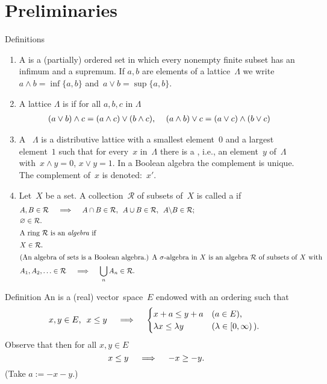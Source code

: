 \documentclass[main.tex]{subfiles}
\begin{document}
\section{Preliminaries}
%
%
\begin{psec}{Definitions}
\label{1.1}
\begin{enumerate}
\item
\label{1.1-1} 
A  is a (partially) ordered set in which
every nonempty finite subset has an infimum and a supremum. 
If $a,b$ are elements of a lattice~$\Lambda$ 
we write~$a\wedge b = \inf\{a,b\}$
and~$a\vee b = \sup\{a,b\}$.
\item 
\label{1.1-2}
A lattice $\Lambda$ is 
if for all $a,b,c$ in $\Lambda$
\begin{align*}
(a\vee b)\wedge c &= (a\wedge c)\vee (b\wedge c)\textnormal{, } &
(a\wedge b)\vee c &= (a\vee c) \wedge (b\vee c) 
\end{align*}
\item 
\label{1.1-3}
A ~$\Lambda$ is a distributive lattice
with a smallest element~$0$
and a largest element~$1$
such that for every~$x$ in~$\Lambda$
there is a ,
i.e., 
an element~$y$ of~$\Lambda$
with~$x\wedge y=0$, $x\vee y=1$.
In a Boolean algebra the complement is unique.
The complement of~$x$ is denoted:~$x'$.
\item 
\label{1.1-4}
Let~$X$ be a set.
A collection~$\mathcal{R}$ 
of subsets of~$X$
is called a  if
\begin{align*}
&A,B\in\mathcal{R} \quad \implies \quad 
  A\cap B \in \mathcal{R}\htam{, }\ 
  A\cup B \in \mathcal{R}\htam{, }\ 
  A\backslash B \in \mathcal{R}\htam{; } \\
&\varnothing \in \mathcal{R} 
\htam{.} \\
\intertext{%
A ring~$\mathcal{R}$ is an \keyword{algebra} if%
}
&X \in \mathcal{R}
\htam{.} \\
\intertext{%
(An algebra of sets is a Boolean algebra.) 
A $\sigma$-algebra in~$X$
is an algebra~$\mathcal{R}$
of subsets of~$X$
with%
}
& A_1, A_2, \ldots \in \mathcal{R}\quad \implies\quad 
  \bigcup_n A_n \in \mathcal{R}
\htam{.}
\end{align*}
\end{enumerate}
\end{psec}
%
%
\begin{psec}{Definition}
\label{1.2}
An  
is a (real) vector~space~$E$
endowed with an ordering such that
\begin{equation*}
x,y\in E\textnormal{, }\ x\leq y
 \quad \implies \quad
\begin{cases}
x+a \leq y+a  
  & (a\in E)\textnormal{, } \\
\lambda x \leq \lambda y 
  & (\lambda \in [0,\infty)\,)\textnormal{. }
\end{cases}
\end{equation*}
Observe that then for all $x,y\in E$
\begin{equation*}
x\leq y \quad \implies \quad -x \geq -y\textnormal{.}
\end{equation*}
(Take $a:=-x-y$.)
\end{psec}
\end{document}
